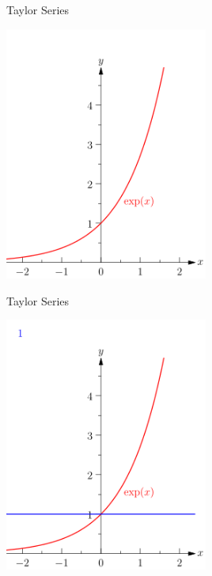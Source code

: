 \documentclass{beamer}
\begin{document}
\begin{frame}{Taylor Series}
      \begin{center}

    \includegraphics[width=0.5\textwidth, height=\textheight, keepaspectratio]{Mfnf-exp-series-imageonline.co-60931-1.png}
  \end{center}
    
\end{frame}
\begin{frame}{Taylor Series}
      \begin{center}

    \includegraphics[width=0.5\textwidth, height=\textheight, keepaspectratio]{Mfnf-exp-series-imageonline.co-60931-2.png}
  \end{center}
    
\end{frame}
\end{document}
